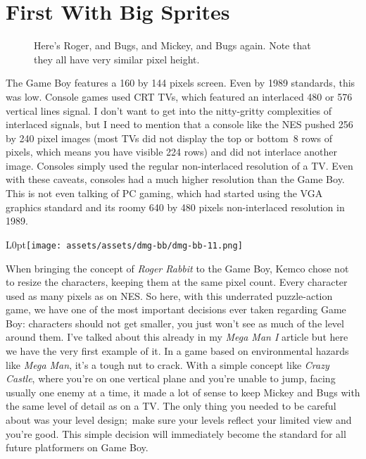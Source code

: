 \documentclass{book}
\begin{document}
\FloatBarrier\section*{First With Big Sprites}
\FloatBarrier\vspace{\baselineskip}\begin{figure}[H]\caption*{Here’s Roger, and Bugs, and Mickey, and Bugs again. Note that they all have very similar pixel height.}\end{figure}
The Game Boy features a 160 by 144 pixels screen. Even by 1989 standards, this was low. Console games used CRT TVs, which featured an interlaced 480 or 576 vertical lines signal. I don’t want to get into the nitty-gritty complexities of interlaced signals, but I need to mention that a console like the NES pushed 256 by 240 pixel images (most TVs did not display the top or bottom~8 rows of pixels, which means you have visible 224 rows) and did not interlace another image. Consoles simply used the regular non-interlaced resolution of a TV. Even with these caveats, consoles had a much higher resolution than the Game Boy. This is not even talking of PC gaming, which had started using the VGA graphics standard and its roomy 640 by 480 pixels non-interlaced resolution in 1989.\par
\begin{wrapfigure}{L}{0pt}{\texttt{[image: assets/assets/dmg-bb/dmg-bb-11.png]}}\end{wrapfigure}\noindent
When bringing the concept of \emph{Roger Rabbit} to the Game Boy, Kemco chose not to resize the characters, keeping them at the same pixel count. Every character used as many pixels as on NES. So here, with this underrated puzzle-action game, we have one of the most important decisions ever taken regarding Game Boy: characters should not get smaller, you just won’t see as much of the level around them. I’ve talked about this already in my \emph{Mega Man I} article but here we have the very first example of it. In a game based on environmental hazards like \emph{Mega Man}, it’s a tough nut to crack. With a simple concept like \emph{Crazy Castle}, where you’re on one vertical plane and you’re unable to jump, facing usually one enemy at a time, it made a lot of sense to keep Mickey and Bugs with the same level of detail as on a TV. The only thing you needed to be careful about was your level design;~make sure your levels reflect your limited view and you’re good. This simple decision will immediately become the standard for all future platformers on Game Boy.\par
\end{document}
